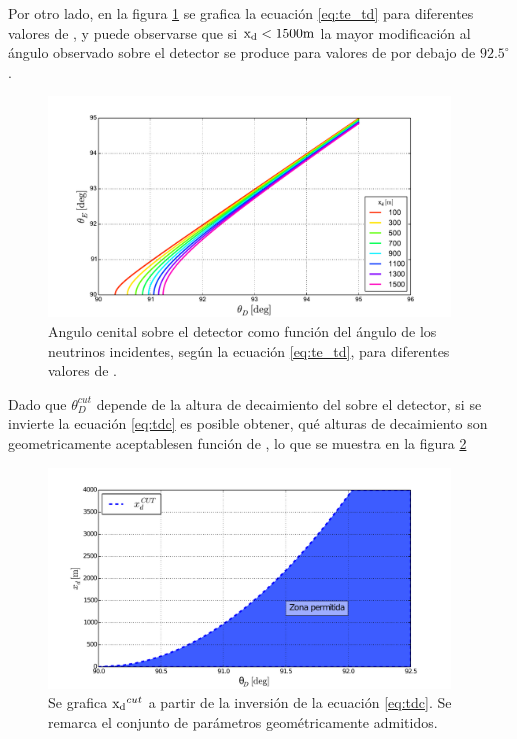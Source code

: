 	Por otro lado, en la figura \ref{fig:te_td} se grafica la ecuaci\'on \ref{eq:te_td} para diferentes valores de \xd{}, y puede observarse que si ${\rm x_d}<1500{\rm m}$ la mayor modificaci\'on al \'angulo observado sobre el detector se produce para valores de \te{} por debajo de $92.5^\circ$.
	\begin{figure}[ht!]
		\centering
		\includegraphics[width=0.95\textwidth]{./fig/appendix/thE_thD}
		\caption{\label{fig:te_td}
		Angulo cenital sobre el detector como funci\'on del \'angulo de los neutrinos incidentes, seg\'un la ecuaci\'on \ref{eq:te_td}, para diferentes valores de \xd{}.
		}
	\end{figure}
	Dado que $\theta_D^{cut}$ depende de la altura de decaimiento del \tauon{} sobre el detector, \xd{} si se invierte la ecuaci\'on \ref{eq:tdc} es posible obtener, qu\'e alturas de decaimiento \xd{} son geometricamente aceptablesen funci\'on de \td{}, lo que se muestra en la figura \ref{fig:dx_thcut}
	\begin{figure}[ht!]
		\centering
		\includegraphics[width=0.95\textwidth]{./fig/appendix/thetaDCut_mod}
		\caption{\label{fig:dx_thcut}
		Se grafica ${\rm x_d}^{cut}$ a partir de la inversi\'on de la ecuaci\'on \ref{eq:tdc}. Se remarca el conjunto de par\'ametros geom\'etricamente admitidos.
		}
	\end{figure}

